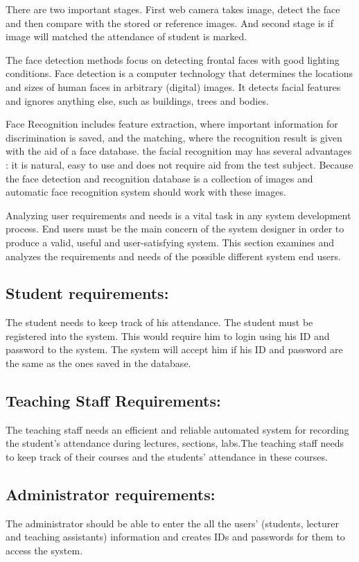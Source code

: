 There are two important stages. First web camera takes image, detect the face and then compare with the stored or reference images. And second stage is if image will matched the attendance of student is marked.

The face detection methods focus on detecting frontal faces with good lighting conditions. Face detection is a computer technology that determines the locations and sizes of human faces in arbitrary (digital) images. It detects facial features and ignores anything else, such as buildings, trees and bodies. \cite{pdya}

Face Recognition includes feature extraction, where important information for discrimination is saved, and the matching, where the recognition result is given with the aid of a face database. the facial recognition may has several advantages : it is natural, easy to use and does not require aid from the test subject. Because the face detection and recognition database is a collection of images and automatic face recognition system should work with these images. \cite{priti}

Analyzing user requirements and needs is a vital task in any system development process. End users must be the main concern of the system designer in order to produce a valid, useful and user-satisfying system. This section examines and analyzes the requirements and needs of the possible different system end users. \cite{manju}

\subsection{Student requirements: }
The student needs to keep track of his attendance. The student must be registered into the system. This would require him to login using his ID and password to the system. The system will accept him if his ID and password are the same as the ones saved in the database. 

\subsection{Teaching Staff Requirements: }
The teaching staff needs an efficient and reliable automated system for recording the student’s attendance during lectures, sections, labs.The teaching staff needs to keep track of their courses and the students’ attendance in these courses. 

\subsection{Administrator requirements: }
The administrator should be able to enter the all the users’ (students, lecturer and teaching assistants) information and creates IDs and passwords for them to access the system. 

